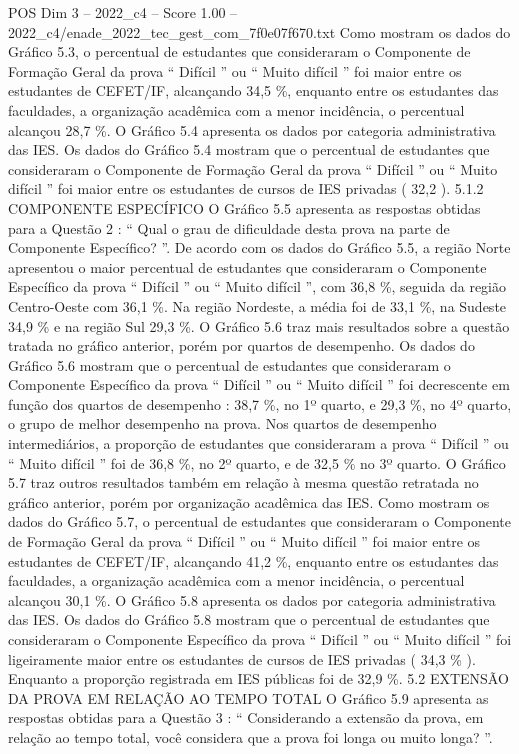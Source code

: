\begin{textsample}{POS Dim 3 – 2022\_c4 – Score 1.00 – 2022\_c4/enade\_2022\_tec\_gest\_com\_7f0e07f670.txt}
Como mostram os dados do Gráfico 5.3, o percentual de estudantes que consideraram o Componente de Formação Geral da prova “ Difícil ” ou “ Muito difícil ” foi maior entre os estudantes de CEFET/IF, alcançando 34,5 \%, enquanto entre os estudantes das faculdades, a organização acadêmica com a menor incidência, o percentual alcançou 28,7 \%.
O Gráfico 5.4 apresenta os dados por categoria administrativa das IES.
Os dados do Gráfico 5.4 mostram que o percentual de estudantes que consideraram o Componente de Formação Geral da prova “ Difícil ” ou “ Muito difícil ” foi maior entre os estudantes de cursos de IES privadas ( 32,2 ). 5.1.2 COMPONENTE ESPECÍFICO O Gráfico 5.5 apresenta as respostas obtidas para a Questão 2 : “ Qual o grau de dificuldade desta prova na parte de Componente Específico? ”.
De acordo com os dados do Gráfico 5.5, a região Norte apresentou o maior percentual de estudantes que consideraram o Componente Específico da prova “ Difícil ” ou “ Muito difícil ”, com 36,8 \%, seguida da região Centro-Oeste com 36,1 \%.
Na região Nordeste, a média foi de 33,1 \%, na Sudeste 34,9 \% e na região Sul 29,3 \%.
O Gráfico 5.6 traz mais resultados sobre a questão tratada no gráfico anterior, porém por quartos de desempenho.
Os dados do Gráfico 5.6 mostram que o percentual de estudantes que consideraram o Componente Específico da prova “ Difícil ” ou “ Muito difícil ” foi decrescente em função dos quartos de desempenho : 38,7 \%, no 1º quarto, e 29,3 \%, no 4º quarto, o grupo de melhor desempenho na prova.
Nos quartos de desempenho intermediários, a proporção de estudantes que consideraram a prova “ Difícil ” ou “ Muito difícil ” foi de 36,8 \%, no 2º quarto, e de 32,5 \% no 3º quarto.
O Gráfico 5.7 traz outros resultados também em relação à mesma questão retratada no gráfico anterior, porém por organização acadêmica das IES.
Como mostram os dados do Gráfico 5.7, o percentual de estudantes que consideraram o Componente de Formação Geral da prova “ Difícil ” ou “ Muito difícil ” foi maior entre os estudantes de CEFET/IF, alcançando 41,2 \%, enquanto entre os estudantes das faculdades, a organização acadêmica com a menor incidência, o percentual alcançou 30,1 \%.
O Gráfico 5.8 apresenta os dados por categoria administrativa das IES.
Os dados do Gráfico 5.8 mostram que o percentual de estudantes que consideraram o Componente Específico da prova “ Difícil ” ou “ Muito difícil ” foi ligeiramente maior entre os estudantes de cursos de IES privadas ( 34,3 \% ).
Enquanto a proporção registrada em IES públicas foi de 32,9 \%. 5.2 EXTENSÃO DA PROVA EM RELAÇÃO AO TEMPO TOTAL O Gráfico 5.9 apresenta as respostas obtidas para a Questão 3 : “ Considerando a extensão da prova, em relação ao tempo total, você considera que a prova foi longa ou muito longa? ”.

\end{textsample}
